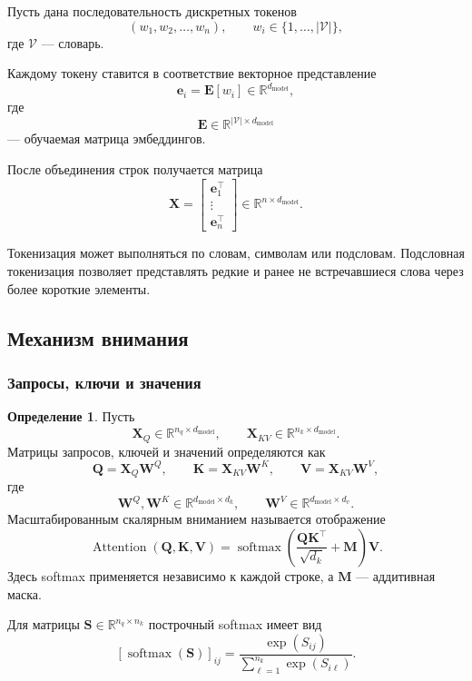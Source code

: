 \documentclass[12pt,a4paper]{article}
\theoremstyle{definition}
\newtheorem{definition}[theorem]{Определение}
\newcommand{\R}{\mathbb{R}}
\newcommand{\softmax}{\operatorname{softmax}}
\newcommand{\1}{\mathbf{1}}
\begin{document}
Пусть дана последовательность дискретных токенов
\[
    (w_1,w_2,\ldots,w_n),
    \qquad
    w_i\in\{1,\ldots,|\mathcal{V}|\},
\]
где $\mathcal{V}$ --- словарь.

Каждому токену ставится в соответствие векторное представление
\[
    \bm{e}_i=\bm{E}[w_i]\in\R^{d_{\text{model}}},
\]
где
\[
    \bm{E}\in\R^{|\mathcal{V}|\times d_{\text{model}}}
\]
--- обучаемая матрица эмбеддингов.

После объединения строк получается матрица
\[
    \bm{X}
    =
    \begin{bmatrix}
        \bm{e}_1^\top\\
        \vdots\\
        \bm{e}_n^\top
    \end{bmatrix}
    \in\R^{n\times d_{\text{model}}}.
\]

Токенизация может выполняться по словам, символам или подсловам.
Подсловная токенизация позволяет представлять редкие и ранее не
встречавшиеся слова через более короткие элементы.

\subsection{Механизм внимания}

\subsubsection{Запросы, ключи и значения}

\begin{definition}
Пусть
\[
    \bm{X}_Q\in\R^{n_q\times d_{\text{model}}},
    \qquad
    \bm{X}_{KV}\in\R^{n_k\times d_{\text{model}}}.
\]
Матрицы запросов, ключей и значений определяются как
\[
    \bm{Q}=\bm{X}_Q\bm{W}^Q,\qquad
    \bm{K}=\bm{X}_{KV}\bm{W}^K,\qquad
    \bm{V}=\bm{X}_{KV}\bm{W}^V,
\]
где
\[
    \bm{W}^Q,\bm{W}^K\in\R^{d_{\text{model}}\times d_k},
    \qquad
    \bm{W}^V\in\R^{d_{\text{model}}\times d_v}.
\]
Масштабированным скалярным вниманием называется отображение
\[
    \operatorname{Attention}(\bm{Q},\bm{K},\bm{V})
    =
    \softmax\left(
        \frac{\bm{Q}\bm{K}^{\top}}{\sqrt{d_k}}+\bm{M}
    \right)\bm{V}.
\]
Здесь softmax применяется независимо к каждой строке, а
$\bm{M}$ --- аддитивная маска.
\end{definition}

Для матрицы $\bm{S}\in\R^{n_q\times n_k}$ построчный softmax имеет вид
\[
    [\softmax(\bm{S})]_{ij}
    =
    \frac{\exp(S_{ij})}
         {\sum_{\ell=1}^{n_k}\exp(S_{i\ell})}.
\]
\end{document}
